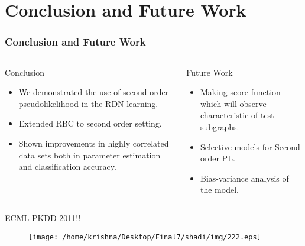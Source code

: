 \documentclass[10pt, blue,subsection=true, compress]{beamer}
\begin{document}
\section{Conclusion and Future Work}
\begin{frame}\frametitle{Conclusion and Future Work}
\begin{columns}[t]
\begin{flushleft}
\begin{block}{Conclusion}
\begin{itemize}
\item We demonstrated the use of second order pseudolikelihood in the RDN learning.
\item Extended RBC to second order setting.
\item Shown improvements in highly correlated data sets both in parameter estimation
and classification accuracy. 
\end{itemize}
\end{block}
\end{flushleft}
\begin{block}{Future Work}
\begin{itemize}
\item Making score function which will observe characteristic
of test subgraphs.
\item Selective models for Second order PL.
\item  Bias-variance analysis of the model.
\end{itemize}
\end{block}
\end{columns}
\begin{block}{}
\begin{center}
{\color{red}
ECML PKDD 2011!!}
\end{center}
\end{block}
\end{frame}


\begin{frame}
 
\begin{center}
\begin{figure}[htbp]
\centering
\texttt{[image: /home/krishna/Desktop/Final7/shadi/img/222.eps]}
\end{figure}
\end{center}
\end{frame} 


\end{document}
